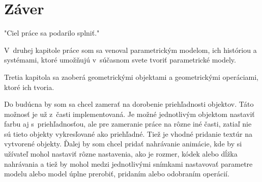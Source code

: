 






\chapter{Záver}
"Ciel práce sa podarilo splniť." 



V~druhej kapitole práce som sa venoval parametrickým modelom, ich históriou a systémami, ktoré umožňujú v~súčasnom svete tvoriť parametrické modely.

Tretia kapitola sa zaoberá geometrickými objektami a geometrickými operáciami, ktoré ich tvoria.








Do budúcna by som sa chcel zamerať na dorobenie priehľadnosti objektov. Táto možnosť je už z~časti implementovaná. Je možné jednotlivým objektom nastaviť farbu aj s~priehľadnosťou, ale pre zameranie práce na rôzne iné časti, zatiaľ nie sú tieto objekty vykresľované ako priehľadné.
Tiež je vhodné pridanie textúr na vytvorené objekty.
Ďalej by som chcel pridať nahrávanie animácie, kde by si užívateľ mohol nastaviť rôzne nastavenia, ako je rozmer, kódek alebo dĺžka nahrávania a tiež by mohol medzi jednotlivými snímkami nastavovať parametre modelu alebo model úplne prerobiť, pridaním alebo odobraním operácií.  


